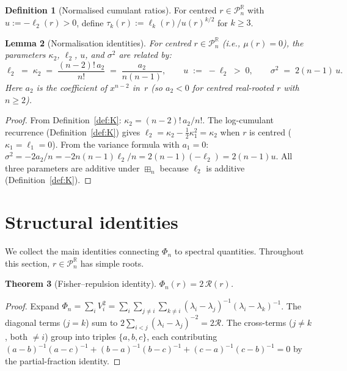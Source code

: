 \documentclass[10pt,a4paper]{amsart}
\theoremstyle{plain}
\newtheorem{theorem}{Theorem}[section]
\newtheorem{lemma}[theorem]{Lemma}
\theoremstyle{definition}
\newtheorem{definition}[theorem]{Definition}
\theoremstyle{remark}
\newcommand{\R}{\mathbb{R}}
\newcommand{\PnR}[1][n]{\mathcal{P}^{\R}_{#1}}
\newcommand{\fp}{\boxplus_n}
\begin{document}
\begin{definition}[Normalised cumulant ratios]
\label{def:tau}
For centred $r\in\PnR$ with $u:=-\ell_2(r)>0$, define
$\tau_k(r):=\ell_k(r)/u(r)^{k/2}$ for $k\ge 3$.
\end{definition}

\begin{lemma}[Normalisation identities]\label{lem:normalisation}
For centred $r\in\PnR$ (i.e., $\mu(r)=0$), the parameters
$\kappa_2$, $\ell_2$, $u$, and $\sigma^2$ are related by:
\begin{equation}\label{eq:norm-chain}
  \ell_2\;=\;\kappa_2\;=\;\frac{(n-2)!\,a_2}{n!}
  \;=\;\frac{a_2}{n(n-1)},
  \qquad
  u\;:=\;-\ell_2\;>\;0,
  \qquad
  \sigma^2\;=\;2(n-1)\,u.
\end{equation}
Here $a_2$ is the coefficient of $x^{n-2}$ in~$r$ (so $a_2<0$
for centred real-rooted $r$ with $n\ge 2$).
\end{lemma}

\begin{proof}
From Definition~\ref{def:K}: $\kappa_2=(n-2)!\,a_2/n!$.
The log-cumulant recurrence (Definition~\ref{def:K}) gives
$\ell_2=\kappa_2-\frac{1}{2}\kappa_1^2=\kappa_2$
when $r$ is centred ($\kappa_1=\ell_1=0$).
From the variance formula with $a_1=0$:
$\sigma^2=-2a_2/n=-2n(n-1)\ell_2/n=2(n-1)(-\ell_2)=2(n-1)u$.
All three parameters are additive under $\fp$
because $\ell_2$ is additive (Definition~\ref{def:K}).
\end{proof}


\section{Structural identities}\label{sec:identities}

We collect the main identities connecting
$\Phi_n$ to spectral quantities.  Throughout
this section, $r\in\PnR$ has simple roots.

\begin{theorem}[Fisher--repulsion identity]
\label{thm:fisher-rep}
$\Phi_n(r)=2\,\mathcal{R}(r)$.
\end{theorem}

\begin{proof}
Expand $\Phi_n=\sum_i V_i^2=\sum_i\sum_{j\ne i}\sum_{k\ne i}(\lambda_i-\lambda_j)^{-1}(\lambda_i-\lambda_k)^{-1}$.
The diagonal terms ($j=k$) sum to $2\sum_{i<j}(\lambda_i-\lambda_j)^{-2}=2\mathcal{R}$.
The cross-terms ($j\ne k$, both $\ne i$) group into triples $\{a,b,c\}$, each contributing
$(a-b)^{-1}(a-c)^{-1}+(b-a)^{-1}(b-c)^{-1}+(c-a)^{-1}(c-b)^{-1}=0$
by the partial-fraction identity.
\end{proof}
\end{document}
